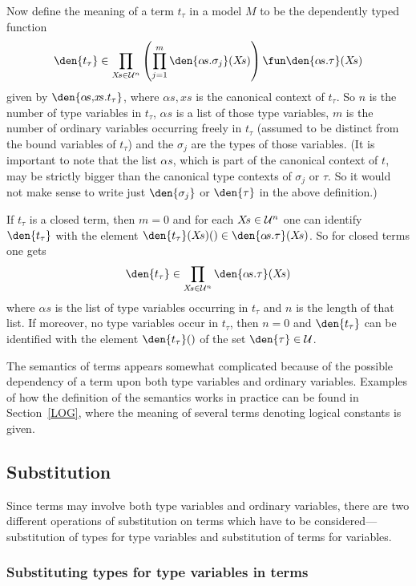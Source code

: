 Now define the meaning of a term $t_{\tau}$ in a model $M$ to be the
dependently typed function
\[ \den{t_{\tau}} \in \prod_{X\!s\in{\cal U}^{n}}
   \left(\prod_{j=1}^{m}\den{\alpha\!s.\sigma_{j}}(X\!s)\right) 
   \fun \den{\alpha\!s.\tau}(X\!s) 
\]
given by $\den{\alpha\!s,\!x\!s.t_{\tau}}$, where $\alpha\!s,\!x\!s$ is the
canonical context of $t_{\tau}$. So $n$ is the number of type variables in
$t_{\tau}$, $\alpha\!s$ is a list of those type variables, $m$ is the
number of ordinary variables occurring freely in $t_{\tau}$ (assumed to be
distinct from the bound variables of $t_{\tau}$) and the $\sigma_{j}$ are
the types of those variables. (It is important to note that the list
$\alpha\!s$, which is part of the canonical context of $t$, may be strictly
bigger than the canonical type contexts of $\sigma_{j}$ or $\tau$. So it
would not make sense to write just $\den{\sigma_{j}}$ or $\den{\tau}$ in
the above definition.)

If $t_{\tau}$ is a closed term, then $m=0$ and for each $X\!s\in{\cal
U}^{n}$ one can identify $\den{t_{\tau}}$ with the element
$\den{t_{\tau}}(X\!s)()\in\den{\alpha\!s.\tau}(X\!s)$. So for closed terms
one gets
\[ \den{t_{\tau}} \in \prod_{X\!s\in{\cal U}^{n}}
\den{\alpha\!s.\tau}(X\!s) 
\]
where $\alpha\!s$ is the list of type variables occurring in $t_{\tau}$ and
$n$ is the length of that list. If moreover, no type variables occur in
$t_{\tau}$, then $n=0$ and $\den{t_{\tau}}$ can be identified with the
element $\den{t_{\tau}}()$ of the set $\den{\tau}\in{\cal U}$.

The semantics of terms appears somewhat complicated because of the
possible dependency of a term upon both type variables and ordinary
variables. Examples of how the definition of the semantics
works in practice can be found in Section~\ref{LOG}, where the meaning
of several terms denoting logical constants is given.

\subsection{Substitution}
\label{term-substitution}

Since terms may involve both type variables and
ordinary variables, there are two different operations of substitution
on terms which have to be considered---substitution of types for type
variables and substitution of terms for variables.

\subsubsection*{Substituting types for type variables in terms}

